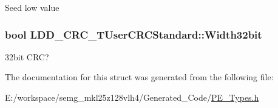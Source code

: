 Seed low value \hypertarget{struct_l_d_d___c_r_c___t_user_c_r_c_standard_a82a24fa9104800759f278afc36a4e00e}{
\subsubsection[{Width32bit}]{\setlength{\rightskip}{0pt plus 5cm}bool L\-D\-D\-\_\-\-C\-R\-C\-\_\-\-T\-User\-C\-R\-C\-Standard\-::\-Width32bit}}\label{struct_l_d_d___c_r_c___t_user_c_r_c_standard_a82a24fa9104800759f278afc36a4e00e}
32bit C\-R\-C? 

The documentation for this struct was generated from the following file\-:\begin{DoxyCompactItemize}
\item 
E\-:/workspace/semg\-\_\-mkl25z128vlh4/\-Generated\-\_\-\-Code/\hyperlink{_p_e___types_8h}{P\-E\-\_\-\-Types.\-h}\end{DoxyCompactItemize}
